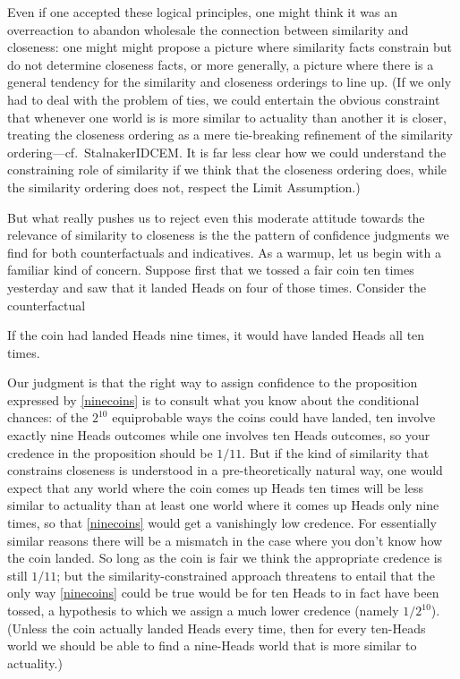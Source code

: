 \documentclass[If.tex]{subfiles}
\begin{document}
Even if one accepted these logical principles, one might think it was an overreaction to abandon wholesale the connection between similarity and closeness: one might might propose a picture where similarity facts constrain but do not determine closeness facts, or more generally, a picture where there is a general tendency for the similarity and closeness orderings to line up. (If we only had to deal with the problem of ties, we could entertain the obvious constraint that whenever one world is is more similar to actuality than another it is closer, treating the closeness ordering as a mere tie-breaking refinement of the similarity ordering---cf.~StalnakerIDCEM. It is far less clear how we could understand the constraining role of similarity if we think that the closeness ordering does, while the similarity ordering does not, respect the Limit Assumption.) 

But what really pushes us to reject even this moderate attitude towards the relevance of similarity to closeness is the the pattern of confidence judgments we find for both counterfactuals and indicatives. As a warmup, let us begin with a familiar kind of concern. Suppose first that we tossed a fair coin ten times yesterday and saw that it landed Heads on four of those times. Consider the counterfactual
\begin{prop}
\nitem \label{ninecoins}
  If the coin had landed Heads nine times, it would have landed Heads all ten times.
\end{prop}
Our judgment is that the right way to assign confidence to the proposition expressed by \ref{ninecoins} is to consult what you know about the conditional chances: of the $2^{10}$ equiprobable ways the coins could have landed, ten involve exactly nine Heads outcomes while one involves ten Heads outcomes, so your credence in the proposition should be $1/11$. But if the kind of similarity that constrains closeness is understood in a pre-theoretically natural way, one would expect that any world where the coin comes up Heads ten times will be less similar to actuality than at least one world where it comes up Heads only nine times, so that \ref{ninecoins} would get a vanishingly low credence. For essentially similar reasons there will be a mismatch in the case where you don't know how the coin landed. So long as the coin is fair we think the appropriate credence is still $1/11$; but the similarity-constrained approach threatens to entail that the only way \ref{ninecoins} could be true would be for ten Heads to in fact have been tossed, a hypothesis to which we assign a much lower credence (namely $1/2^{10}$). (Unless the coin actually landed Heads every time, then for every ten-Heads world we should be able to find a nine-Heads world that is more similar to actuality.)
\end{document}
